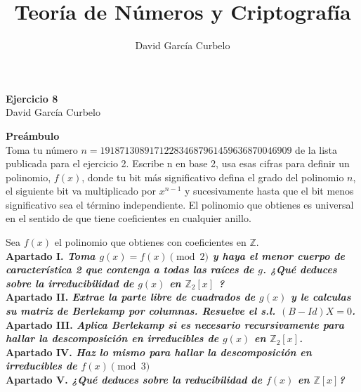 \documentclass[fleqn]{article}
\author{David García Curbelo}
\title{Teoría de Números y Criptografía}
\def\Z{\mathds{Z}}
\begin{document}
    \begin{center}
        \LARGE{\textbf{Ejercicio 8}} \\
        \Large{David García Curbelo} \\
    \end{center}

    \vspace{1cm}

    \textbf{Preámbulo} \\
    Toma tu número $n=191871308917122834687961459636870046909$ de la lista publicada para el ejercicio 2.
    Escribe n en base 2, usa esas cifras para definir un polinomio, $f(x)$, donde tu bit más significativo
    defina el grado del polinomio $n$, el siguiente bit va multiplicado por $x^{n-1}$ y sucesivamente hasta 
    que el bit menos significativo sea el término independiente. El polinomio que obtienes es universal en el
    sentido de que tiene coeficientes en cualquier anillo.

    \newpage
    Sea $f(x)$ el polinomio que obtienes con coeficientes en $\Z$.\\ 

    \textbf{Apartado I. \textit{Toma $g(x) = f(x) \pmod{2}$ y haya el menor cuerpo de característica 2 que contenga
                                a todas las raíces de $g$. ¿Qué deduces sobre la irreducibilidad de $g(x)$ en $\Z_2[x]$ ?}}\\
    

    \newpage
    \textbf{Apartado II. \textit{Extrae la parte libre de cuadrados de $g(x)$ y le calculas su matriz de Berlekamp por
                                columnas. Resuelve el s.l. $(B - Id)X = 0$.}}\\

    \newpage
    \textbf{Apartado III. \textit{Aplica Berlekamp si es necesario recursivamente para hallar la descomposición en irreducibles de $g(x)$ en $\Z_2[x]$.}} \\


    \newpage
    \textbf{Apartado IV. \textit{Haz lo mismo para hallar la descomposición en irreducibles de $f(x) \pmod{3}$}}\\
    \newpage
    \textbf{Apartado V. \textit{¿Qué deduces sobre la reducibilidad de $f(x)$ en $\Z[x]$?}}\\
\end{document}
